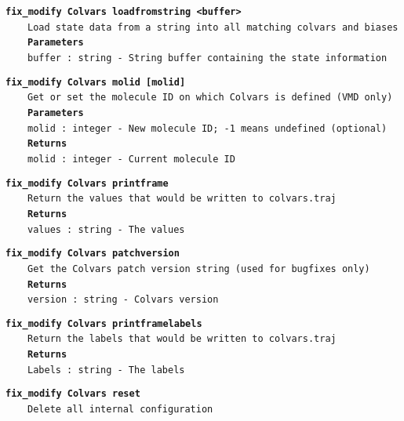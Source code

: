 \begin{mdexampleinput}{}
\texttt{\textbf{fix\_modify Colvars loadfromstring <buffer>}}
\\
\-~~~~\texttt{Load state data from a string into all matching colvars and biases}
\\
\-~~~~\texttt{\textbf{Parameters}}
\\
\-~~~~\texttt{buffer : string - String buffer containing the state information}
\end{mdexampleinput}
\begin{mdexampleinput}{}
\texttt{\textbf{fix\_modify Colvars molid [molid]}}
\\
\-~~~~\texttt{Get or set the molecule ID on which Colvars is defined (VMD only)}
\\
\-~~~~\texttt{\textbf{Parameters}}
\\
\-~~~~\texttt{molid : integer - New molecule ID; -1 means undefined (optional)}
\\
\-~~~~\texttt{\textbf{Returns}}
\\
\-~~~~\texttt{molid : integer - Current molecule ID}
\end{mdexampleinput}
\begin{mdexampleinput}{}
\texttt{\textbf{fix\_modify Colvars printframe}}
\\
\-~~~~\texttt{Return the values that would be written to colvars.traj}
\\
\-~~~~\texttt{\textbf{Returns}}
\\
\-~~~~\texttt{values : string - The values}
\end{mdexampleinput}
\begin{mdexampleinput}{}
\texttt{\textbf{fix\_modify Colvars patchversion}}
\\
\-~~~~\texttt{Get the Colvars patch version string (used for bugfixes only)}
\\
\-~~~~\texttt{\textbf{Returns}}
\\
\-~~~~\texttt{version : string - Colvars version}
\end{mdexampleinput}
\begin{mdexampleinput}{}
\texttt{\textbf{fix\_modify Colvars printframelabels}}
\\
\-~~~~\texttt{Return the labels that would be written to colvars.traj}
\\
\-~~~~\texttt{\textbf{Returns}}
\\
\-~~~~\texttt{Labels : string - The labels}
\end{mdexampleinput}
\begin{mdexampleinput}{}
\texttt{\textbf{fix\_modify Colvars reset}}
\\
\-~~~~\texttt{Delete all internal configuration}
\end{mdexampleinput}
